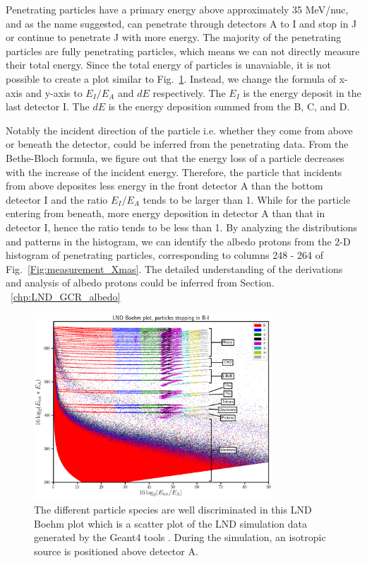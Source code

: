 Penetrating particles have a primary energy above approximately 35 MeV/nuc, and as the name suggested, can penetrate through detectors A to I and stop in J or continue to penetrate J with more energy. The majority of the penetrating particles are fully penetrating particles, which means we can not directly measure their total energy. 
Since the total energy of particles is unavaiable, it is not possible to create a plot similar to Fig.~\ref{Fig:LND-Boehm-plot}. Instead, we change the formula of x-axis and y-axis to $E_I/E_A$ and $dE$ respectively. The $E_I$ is the energy deposit in the last detector I. The $dE$ is the energy deposition summed from the B, C, and D.

Notably the incident direction of the particle i.e. whether they come from above or beneath the detector, could be inferred from the penetrating data. From the Bethe-Bloch formula, we figure out that the energy loss of a particle decreases with the increase of the incident energy. 
Therefore, the particle that incidents from above deposites less energy in the front detector A than the bottom detector I and the ratio $E_I/E_A$ tends to be larger than 1. While for the particle entering from beneath, more energy deposition in detector A than that in detector I, hence the ratio tends to be less than 1. 
By analyzing the distributions and patterns in the histogram, we can identify the albedo protons from the 2-D histogram of penetrating particles, corresponding to columns 248 - 264 of Fig.~\ref{Fig:measurement_Xmas}.
The detailed understanding of the derivations and analysis of albedo protons could be inferred from Section. ~\ref{chp:LND_GCR_albedo}


\begin{figure}
    \centering
    \includegraphics[width=0.8\textwidth]{images/LND_Boehm_plot_isotropic_on_top_of_A_annotated.png}
    \caption[LND Boehm plot of stopping particles based on the simulated data]{The different particle species are well discriminated in this LND Boehm plot which is a scatter plot of the \ac{LND} simulation data generated by the \ac{Geant4} tools \citep{Agostinelli-2003}. During the simulation, an isotropic source is positioned above detector A.}
    \label{Fig:LND-Boehm-plot}
\end{figure}


